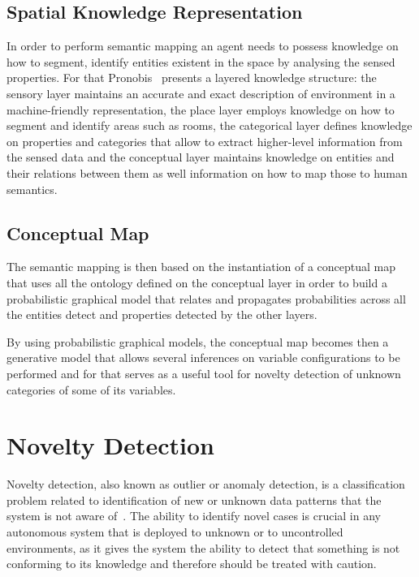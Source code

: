 \documentclass[9pt,a4paper]{extarticle}
\begin{document}
\begin{multicols}{2}
\subsection{Spatial Knowledge Representation}
In order to perform semantic mapping an agent needs to possess knowledge on how to segment, identify
entities existent in the space by analysing the sensed properties. For that Pronobis~\cite{pronobis2011semmap} presents a
layered knowledge structure:
the sensory layer maintains an accurate and exact description of environment in a machine-friendly representation,
the place layer employs knowledge on how to segment and identify areas such as rooms,
the categorical layer defines knowledge on properties and categories that allow to extract
higher-level information from the sensed data
and the conceptual layer maintains knowledge on entities and their relations between them as well
information on how to map those to human semantics.

\subsection{Conceptual Map}
The semantic mapping is then based on the instantiation of a conceptual map that uses all the
ontology defined on the conceptual layer in order to build a probabilistic graphical model that
relates and propagates probabilities across all the entities detect and properties detected by the
other layers.

By using probabilistic graphical models, the conceptual map becomes then a generative model that
allows several inferences on variable configurations to be performed and for that serves as a useful
tool for novelty detection of unknown categories of some of its variables.

\section{Novelty Detection}
Novelty detection, also known as outlier or anomaly detection, is a
classification problem related to identification of new or unknown data
patterns that the system is not aware of~\cite{markou2003novelty}.
The ability to identify novel cases is crucial in any autonomous system
that is deployed to unknown or to uncontrolled environments, as it gives the
system the ability to detect that something is not conforming to its knowledge and
therefore should be treated with caution.


\end{multicols}
\end{document}
